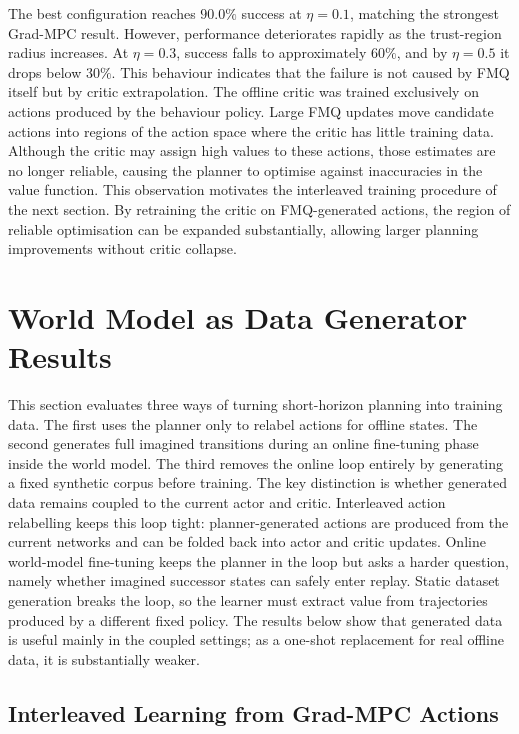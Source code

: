The best configuration reaches $90.0\%$ success at $\eta=0.1$,
matching the strongest Grad-MPC result. However, performance
deteriorates rapidly as the trust-region radius increases.
At $\eta=0.3$, success falls to approximately $60\%$, and by
$\eta=0.5$ it drops below $30\%$. This behaviour indicates that the
failure is not caused by FMQ itself but by critic extrapolation.
The offline critic was trained exclusively on actions produced by the
behaviour policy. Large FMQ updates move candidate actions into
regions of the action space where the critic has little training data.
Although the critic may assign high values to these actions, those
estimates are no longer reliable, causing the planner to optimise
against inaccuracies in the value function.
This observation motivates the interleaved training procedure of
the next section. By retraining the critic on FMQ-generated actions,
the region of reliable optimisation can be expanded substantially,
allowing larger planning improvements without critic collapse.

\section{World Model as Data Generator Results}

This section evaluates three ways of turning short-horizon planning into
training data. The first uses the planner only to relabel actions for
offline states. The second generates full imagined transitions during an
online fine-tuning phase inside the world model. The third removes the
online loop entirely by generating a fixed synthetic corpus before
training.
The key distinction is whether generated data remains coupled to the
current actor and critic. Interleaved action relabelling keeps this loop
tight: planner-generated actions are produced from the current networks
and can be folded back into actor and critic updates. Online
world-model fine-tuning keeps the planner in the loop but asks a harder
question, namely whether imagined successor states can safely enter
replay. Static dataset generation breaks the loop, so the learner must
extract value from trajectories produced by a different fixed policy.
The results below show that generated data is useful mainly in the
coupled settings; as a one-shot replacement for real offline data, it is
substantially weaker.

\subsection{Interleaved Learning from Grad-MPC Actions}
\label{sec:exp-mpc-interleaved-grad}


